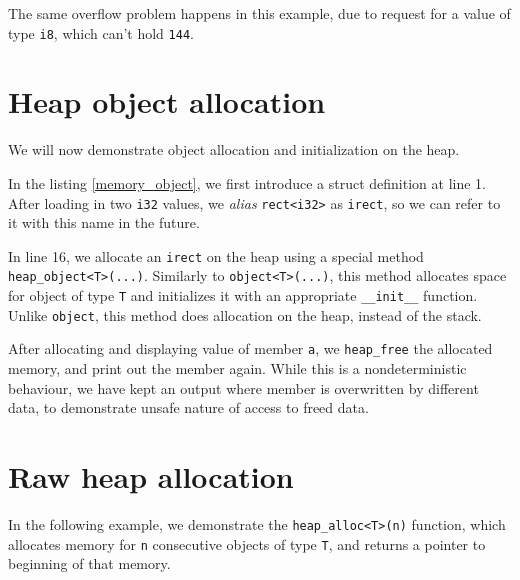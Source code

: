 \documentclass[times, utf8, diplomski]{fer}
\theoremstyle{definition}
\newcommand{\textcode}[3]{
    
}
\begin{document}
\textcode{\resdir/programs/fib_compile_time.out}{fib_ct_out}{Compile-time Fibonacci - output}

The same overflow problem happens in this example, due to request for a value of type \texttt{i8},
which can't hold \texttt{144}.


\section{Heap object allocation}

We will now demonstrate object allocation and initialization on the heap. 

\textcode{\resdir/programs/memory_object.agt}{memory_object}{Heap object allocation}
\textcode{\resdir/programs/memory_object.in}{memory_object_in}{Heap object allocation - input}
\textcode{\resdir/programs/memory_object.out}{memory_object_out}{Heap object allocation - output}

In the listing \ref{memory_object}, we first introduce a struct definition at line 1.
After loading in two \texttt{i32} values, we \textit{alias} \texttt{rect<i32>} as \texttt{irect},
so we can refer to it with this name in the future.

In line 16, we allocate an \texttt{irect} on the heap using a special method \texttt{heap\_object<T>(...)}.
Similarly to \texttt{object<T>(...)}, this method allocates space for object of type \texttt{T} and
initializes it with an appropriate \texttt{\_\_init\_\_} function. Unlike \texttt{object}, this method
does allocation on the heap, instead of the stack.

After allocating and displaying value of member \texttt{a}, 
we \texttt{heap\_free} the allocated memory, and
print out the member again. While this is a nondeterministic behaviour,
we have kept an output where member is overwritten by different data, to demonstrate
unsafe nature of access to freed data.


\section{Raw heap allocation}

In the following example, we demonstrate the \texttt{heap\_alloc<T>(n)} function,
which allocates memory for \texttt{n} consecutive objects of type \texttt{T},
and returns a pointer to beginning of that memory.

\textcode{\resdir/programs/memory_alloc.agt}{memory_alloc}{Raw heap allocation}
\textcode{\resdir/programs/memory_alloc.out}{memory_alloc}{Raw heap allocation - output}
\end{document}
